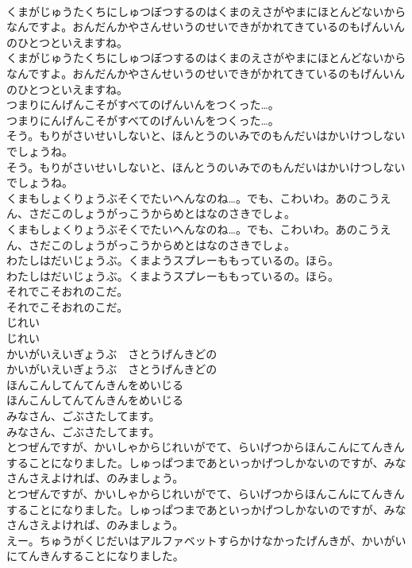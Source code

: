 \documentclass[8pt]{extreport}
\begin{document}
\begin{CJK}{UTF8}{min}
\\	くまがじゅうたくちにしゅつぼつするのはくまのえさがやまにほとんどないからなんですよ。おんだんかやさんせいうのせいできがかれてきているのもげんいんのひとつといえますね。
\\	くまがじゅうたくちにしゅつぼつするのはくまのえさがやまにほとんどないからなんですよ。おんだんかやさんせいうのせいできがかれてきているのもげんいんのひとつといえますね。
\\	つまりにんげんこそがすべてのげんいんをつくった…。
\\	つまりにんげんこそがすべてのげんいんをつくった…。
\\	そう。もりがさいせいしないと、ほんとうのいみでのもんだいはかいけつしないでしょうね。
\\	そう。もりがさいせいしないと、ほんとうのいみでのもんだいはかいけつしないでしょうね。
\\	くまもしょくりょうぶそくでたいへんなのね…。でも、こわいわ。あのこうえん、さだこのしょうがっこうからめとはなのさきでしょ。
\\	くまもしょくりょうぶそくでたいへんなのね…。でも、こわいわ。あのこうえん、さだこのしょうがっこうからめとはなのさきでしょ。
\\	わたしはだいじょうぶ。くまようスプレーももっているの。ほら。
\\	わたしはだいじょうぶ。くまようスプレーももっているの。ほら。
\\	それでこそおれのこだ。
\\	それでこそおれのこだ。
\\	じれい
\\	じれい
\\	かいがいえいぎょうぶ　さとうげんきどの
\\	かいがいえいぎょうぶ　さとうげんきどの
\\	ほんこんしてんてんきんをめいじる
\\	ほんこんしてんてんきんをめいじる
\\	みなさん、ごぶさたしてます。
\\	みなさん、ごぶさたしてます。
\\	とつぜんですが、かいしゃからじれいがでて、らいげつからほんこんにてんきんすることになりました。しゅっぱつまであといっかげつしかないのですが、みなさんさえよければ、のみましょう。
\\	とつぜんですが、かいしゃからじれいがでて、らいげつからほんこんにてんきんすることになりました。しゅっぱつまであといっかげつしかないのですが、みなさんさえよければ、のみましょう。
\\	えー。ちゅうがくじだいはアルファベットすらかけなかったげんきが、かいがいにてんきんすることになりました。

\end{CJK}
\end{document}

